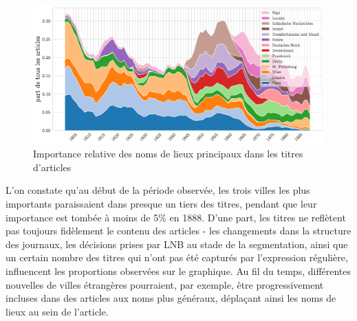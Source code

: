\documentclass[a4paper,twoside,12pt]{article}
\begin{document}
\begin{figure}[h]
\centering
\captionsetup{justification=centering}
\includegraphics[width=\textwidth]{images/headings_places.pdf}
\caption{Importance relative des noms de lieux principaux dans les titres d'articles}
\label{fig:headings_places}
\end{figure}

L'on constate qu'au début de la période observée, les trois villes les plus importants paraissaient dans presque un tiers des titres, pendant que leur importance est tombée à moins de 5\% en 1888. D'une part, les titres ne reflètent pas toujours fidèlement le contenu des articles - les changements dans la structure des journaux, les décisions prises par LNB au stade de la segmentation, ainsi que un certain nombre des titres qui n'ont pas été capturés par l'expression régulière, influencent les proportions observées sur le graphique. Au fil du temps, différentes nouvelles de villes étrangères pourraient, par exemple, être progressivement incluses dans des articles aux noms plus généraux, déplaçant ainsi les noms de lieux au sein de l'article.
\end{document}
